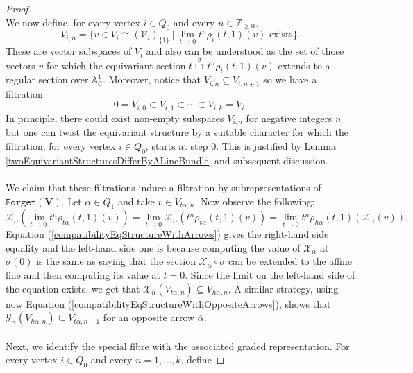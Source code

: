 \documentclass{amsart}
\theoremstyle{plain}
\numberwithin{equation}{section}
\theoremstyle{definition}
\theoremstyle{remark}
\begin{document}
\begin{proof}
		\\
		We now define, for every vertex \(i\in Q_0\) and every $n\in \mathbb{Z}_{\geq0}$,
		\begin{equation}\label{piecesFiltrationFromFamily}
			V_{i,n}=\{v\in V_i\cong (\mathcal{V}_i)_{\{1\}}\ |
			\ \lim_{t\to 0}t^n\rho_i(t,1)(v)\text{ exists}\}.
		\end{equation}
		These are vector subspaces of $V_i$ and also can be understood as the set of those vectors $v$ for which the equivariant section $t\overset{\sigma}{\mapsto} t^n\rho_i(t,1)(v)$ extends to a regular section over $\mathbb{A}^1_{\mathbb{C}}$. Moreover, notice that $V_{i,n}\subseteq V_{i,n+1}$ so we have a filtration
		\[
		0=V_{i,0}\subset V_{i,1}\subset\cdots\subset V_{i,k}=V_i.
		\]
		In principle, there could exist non-empty subspaces $V_{i,n}$ for negative integers $n$ but one can twist the equivariant structure by a suitable character for which the filtration, for every vertex $i\in Q_0$, starts at step 0. This is justified by Lemma \ref{twoEquivariantStructuresDifferByALineBundle} and subsequent discussion.  
		\\
		\\
		We claim that these filtrations induce a filtration by subrepresentations of
		$\texttt{Forget}(\mathbf V)$. Let \(\alpha\in Q_1\) and take
		\(v\in V_{t\alpha,n}\). Now observe the following:
		\begin{equation}\label{evaluatingMorphismInArrowsCommutesWithLimits}
			\mathcal{X}_{\alpha}(\lim_{t\to 0}t^n\rho_{t\alpha}(t,1)(v))=\lim_{t\to 0}
			\mathcal{X}_{\alpha}(t^n\rho_{t\alpha}(t,1)(v))=\lim_{t\to 0} t^n\rho_{h\alpha}(t,1)(\mathcal{X}_\alpha(v)).
		\end{equation}
		Equation (\ref{compatibilityEqStructureWithArrows}) gives the right-hand side equality and the left-hand side one is because computing the value of $\mathcal{X}_\alpha$ at $\sigma(0)$ is the same as saying that the section $\mathcal{X}_{\alpha}\circ \sigma$ can be extended to the affine line and then computing its value at $t=0$. Since the limit on the left-hand side of the equation exists, we get that $\mathcal{X}_\alpha(V_{t\alpha,n})\subseteq V_{h\alpha,n}$. A similar strategy, using now Equation (\ref{compatibilityEqStructureWithOppositeArrows}), shows that $\mathcal{Y}_{\overline\alpha}(V_{h\alpha,n})\subseteq V_{t\alpha,n+1}$ for an opposite arrow $\overline{\alpha}$.
		\\
		\\
		Next, we identify the special fibre with the associated graded
		representation. For every vertex $i\in Q_0$ and every $n=1,\ldots,k$, define

\end{proof}
\end{document}
